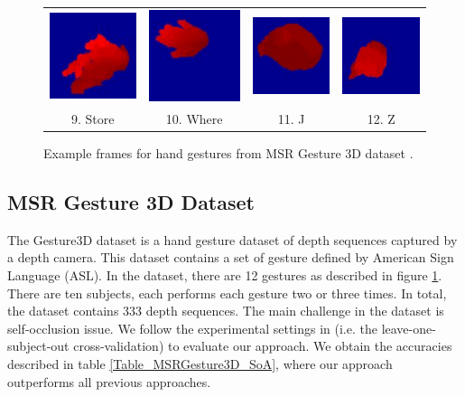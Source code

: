\documentclass[final,3p,times,twocolumn]{elsarticle}
\begin{document}
\begin{figure}[h]
{\begin{tabular}{cccc}
			\includegraphics[width=0.22\columnwidth]{Figures/MSRGesture3D_store.pdf} &          \includegraphics[width=0.22\columnwidth]{Figures/MSRGesture3D_where.pdf} &          \includegraphics[width=0.22\columnwidth]{Figures/MSRGesture3D_j.pdf} &          \includegraphics[width=0.22\columnwidth]{Figures/MSRGesture3D_z.pdf} \\
			
			9. Store &          10. Where &          11. J &          12. Z \\
			
		\end{tabular}  
		
	}
	\caption{Example frames for hand gestures from MSR Gesture 3D dataset \cite{wang2012robust}.}
	\label{Figure_ExampleFrames_MSRGesture3D}
\end{figure}

\subsection{MSR Gesture 3D Dataset}

The Gesture3D dataset \cite{wang2012robust} is a hand gesture dataset of depth sequences captured by a depth camera.
This dataset contains a set of gesture defined by American Sign Language (ASL).
In the dataset, there are 12 gestures as described in figure \ref{Figure_ExampleFrames_MSRGesture3D}.
There are ten subjects, each performs each gesture two or three times.
In total, the dataset contains 333 depth sequences.
The main challenge in the dataset is self-occlusion issue.
We follow the experimental settings in \cite{wang2012robust} (i.e. the leave-one-subject-out cross-validation) to evaluate our approach.
We obtain the accuracies described in table \ref{Table_MSRGesture3D_SoA}, where our approach outperforms all previous approaches.
\end{document}
